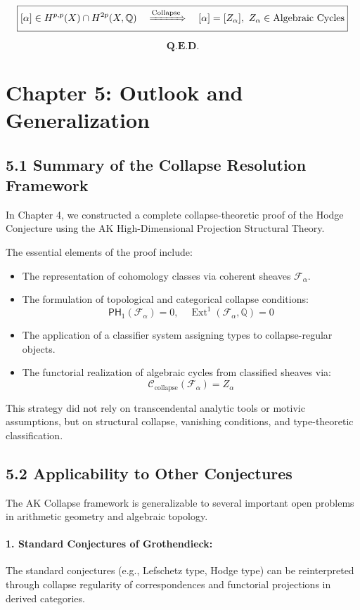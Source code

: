 \documentclass[11pt]{article}
\DeclareMathOperator{\Ext}{Ext}
\begin{document}
\[
\boxed{
[\alpha] \in H^{p,p}(X) \cap H^{2p}(X, \mathbb{Q}) \quad \xRightarrow{\text{Collapse}} \quad [\alpha] = [Z_\alpha], \ Z_\alpha \in \text{Algebraic Cycles}
}
\]

\[
\textbf{Q.E.D.}
\]



\section{Chapter 5: Outlook and Generalization}

\subsection{5.1 Summary of the Collapse Resolution Framework}

In Chapter 4, we constructed a complete collapse-theoretic proof of the Hodge Conjecture using the AK High-Dimensional Projection Structural Theory.

The essential elements of the proof include:

\begin{itemize}
  \item The representation of cohomology classes via coherent sheaves $\mathcal{F}_\alpha$.
  \item The formulation of topological and categorical collapse conditions:
  \[
  \mathsf{PH}_1(\mathcal{F}_\alpha) = 0, \quad \Ext^1(\mathcal{F}_\alpha, \mathbb{Q}) = 0
  \]
  \item The application of a classifier system assigning types to collapse-regular objects.
  \item The functorial realization of algebraic cycles from classified sheaves via:
  \[
  \mathcal{C}_{\text{collapse}}(\mathcal{F}_\alpha) = Z_\alpha
  \]
\end{itemize}

This strategy did not rely on transcendental analytic tools or motivic assumptions, but on structural collapse, vanishing conditions, and type-theoretic classification.

\subsection{5.2 Applicability to Other Conjectures}

The AK Collapse framework is generalizable to several important open problems in arithmetic geometry and algebraic topology.

\paragraph{1. Standard Conjectures of Grothendieck:}
The standard conjectures (e.g., Lefschetz type, Hodge type) can be reinterpreted through collapse regularity of correspondences and functorial projections in derived categories.
\end{document}
